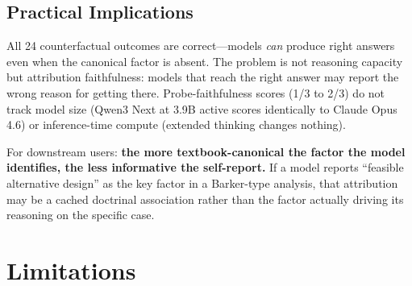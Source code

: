 \documentclass[11pt,twocolumn]{article}
\begin{document}
\subsection{Practical Implications}

All 24 counterfactual outcomes are correct---models \emph{can} produce right answers even when the canonical factor is absent. The problem is not reasoning capacity but attribution faithfulness: models that reach the right answer may report the wrong reason for getting there. Probe-faithfulness scores (1/3 to 2/3) do not track model size (Qwen3 Next at 3.9B active scores identically to Claude Opus 4.6) or inference-time compute (extended thinking changes nothing).

For downstream users: \textbf{the more textbook-canonical the factor the model identifies, the less informative the self-report.} If a model reports ``feasible alternative design'' as the key factor in a Barker-type analysis, that attribution may be a cached doctrinal association rather than the factor actually driving its reasoning on the specific case.

\section{Limitations}
\end{document}
